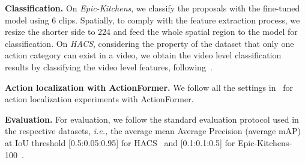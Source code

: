 \documentclass[10pt,journal,compsoc]{IEEEtran}
\begin{document}
\textbf{Classification. }On \textit{Epic-Kitchens}, we classify the proposals with the fine-tuned model using 6 clips. Spatially, to comply with the feature extraction process, we resize the shorter side to 224 and feed the whole spatial region to the model for classification.
On \textit{HACS}, considering the property of the dataset that only one action category can exist in a video, we obtain the video level classification results by classifying the video level features, following~\cite{hacscompetition}.

\textbf{Action localization with ActionFormer. }
We follow all the settings in~\cite{actionformer-ek100-2022-challenge-report,zhang2022actionformer} for action localization experiments with ActionFormer.

\textbf{Evaluation.} For evaluation, we follow the standard evaluation protocol used in the respective datasets, \textit{i.e.,} the average mean Average Precision (average mAP) at IoU threshold [0.5:0.05:0.95] for HACS~\cite{hacs} and [0.1:0.1:0.5] for Epic-Kitchens-100~\cite{ek100}. 
\end{document}
